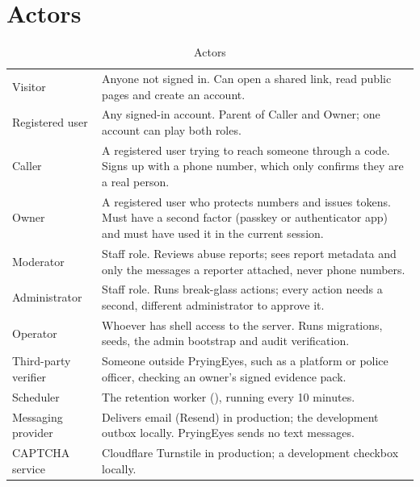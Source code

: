 \section{Actors}
\label{sec:actors}

\begin{table}[h]
\centering\small
\caption{Actors}\label{tab:actors}
\begin{tabularx}{\linewidth}{@{}L{3.3cm}Y@{}}
\toprule
{} &  \\
\midrule
Visitor & Anyone not signed in. Can open a shared link, read public pages and create an account. \\
Registered user & Any signed-in account. Parent of Caller and Owner; one account can play both roles. \\
Caller & A registered user trying to reach someone through a code. Signs up with a phone number, which only confirms they are a real person. \\
Owner & A registered user who protects numbers and issues tokens. Must have a second factor (passkey or authenticator app) and must have used it in the current session. \\
Moderator & Staff role. Reviews abuse reports; sees report metadata and only the messages a reporter attached, never phone numbers. \\
Administrator & Staff role. Runs break-glass actions; every action needs a second, different administrator to approve it. \\
Operator & Whoever has shell access to the server. Runs migrations, seeds, the admin bootstrap and audit verification. \\
Third-party verifier & Someone outside PryingEyes, such as a platform or police officer, checking an owner's signed evidence pack. \\
Scheduler & The retention worker (), running every 10 minutes. \\
Messaging provider &  Delivers email (Resend) in production; the development outbox locally. PryingEyes sends no text messages. \\
CAPTCHA service &  Cloudflare Turnstile in production; a development checkbox locally. \\
\bottomrule
\end{tabularx}
\end{table}

